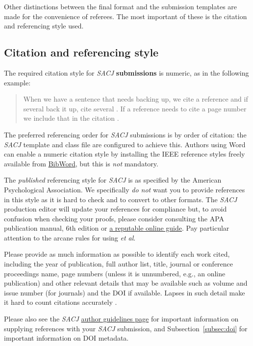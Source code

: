 \documentclass[submission]{sacjsub}
\begin{document}
Other distinctions between the final format and the submission templates are made for the convenience of referees. The most important of these is the citation and referencing style used.

\subsection{Citation and referencing style} \label{subsec:refs}
The required citation style for {\em SACJ} \textbf{submissions} is numeric, as in the following example:

\begin{quote}
    When we have a sentence that needs backing up, we cite a reference \cite{kopka1995guide} and if several back it up, cite several \cite{kopka1995guide,apa2013}. If a reference needs to cite a page number we include that in the citation \cite[p 42]{apa2013}.
\end{quote}
The preferred referencing order for {\em SACJ} submissions is by order of citation: the {\em SACJ} template and class file are configured to achieve this. Authors using Word can enable a numeric citation style by installing the IEEE reference styles freely available from \href{https://bibword.codeplex.com}{BibWord}, but this is {\em not} mandatory.

The {\em published} referencing style for {\em SACJ} is as specified by the American Psychological Association. We specifically {\em do not} want you to provide references in this
style as it is hard to check and to convert to other formats. The {\em SACJ} production editor will update your references for compliance but, to avoid confusion when checking your proofs, please consider consulting the APA publication manual, 6th edition \cite{apa2013} or \href{https://owl.english.purdue.edu/owl/resource/560/05/}{a reputable online guide}. Pay particular attention to the arcane rules for using {\em et al}.

Please provide as much information as possible to identify each work cited, including the year of publication, full author list, title, journal or conference proceedings name, page numbers (unless it is unnumbered, e.g., an online publication) and other relevant details that may be available such as volume and issue number (for journals) and the DOI if available. Lapses in such detail make it hard to count citations accurately \cite{lariviere2006place}.

Please also see the \emph{SACJ} \href{http://sacj.cs.uct.ac.za/index.php/sacj/about/submissions#authorGuidelines}{author guidelines page} for important information on supplying references with your {\em SACJ} submission, and Subsection~\ref{subsec:doi} for important information on DOI metadata.
\end{document}
